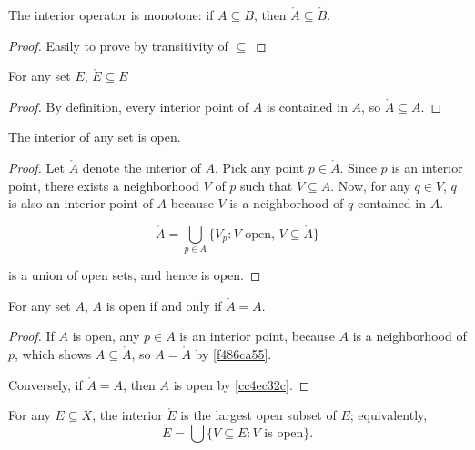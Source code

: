 \begin{corollary}\label{bfb0d46a}
    The interior operator is monotone: if $A \subseteq B$, then $\mathring{A} \subseteq \mathring{B}$.
\end{corollary}


\begin{proof}
    Easily to prove by transitivity of $\subseteq$
\end{proof}

\begin{corollary}\label{f486ca55}
    For any set $E$, $\mathring{E} \subseteq E$
\end{corollary}

\begin{proof}
    By definition, every interior point of $A$ is contained in $A$, so $\mathring{A} \subseteq A$.
\end{proof}

\begin{thm}\label{cc4ec32c}
    The interior of any set is open.
\end{thm}

\begin{proof}
    Let $\mathring{A}$ denote the interior of $A$.
    Pick any point $p \in \mathring{A}$. 
    Since $p$ is an interior point, 
    there exists a neighborhood $V$ of $p$ such that $V \subseteq A$. 
    Now, for any $q \in V$, $q$ is also an interior point of $A$ because $V$ is a neighborhood of $q$ contained in $A$.

    \[
    \mathring{A} = \bigcup_{p \in A} \{ V_p : V \text{ open},\, V \subseteq \mathring{A} \}
    \]
    
    is a union of open sets, and hence is open.
\end{proof}

\begin{thm}
    For any set $A$, $A$ is open if and only if $\mathring{A} = A$.
\end{thm}

\begin{proof}
    If $A$ is open, any $p \in A$ is an interior point, 
    because $A$ is a neighborhood of $p$,
    which shows $A \subseteq \mathring{A}$, so $A = \mathring{A}$ by \cref{f486ca55}.

    Conversely, if $\mathring{A} = A$, then $A$ is open by \cref{cc4ec32c}.
\end{proof}

\begin{thm}
    For any $E\subseteq X$, the interior $\mathring{E}$ is the largest open subset of $E$; equivalently,
    \[
        \mathring{E} = \bigcup\{V \subseteq E : V \text{ is open} \} .
    \]
\end{thm}

